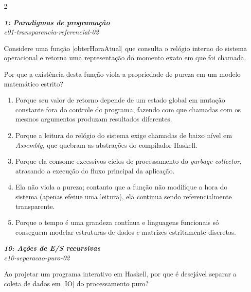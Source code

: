 \documentclass[a4paper,10pt,brazil]{article}
\begin{document}
\begin{multicols}{2}
\begin{enumerate}
\end{enumerate}

\begin{flushright}
  \footnotesize
  \textit{\textbf{1: Paradigmas de programação}}\\
  \textit{c01-transparencia-referencial-02}\\

\end{flushright}
Considere uma função \haskellinline|obterHoraAtual| que consulta o relógio interno do sistema operacional e retorna uma representação do momento exato em que foi chamada.

Por que a existência desta função viola a propriedade de pureza em um modelo matemático estrito?

\begin{enumerate}
  \item Porque seu valor de retorno depende de um estado global em mutação constante fora do controle do programa, fazendo com que chamadas com os mesmos argumentos produzam resultados diferentes.

  \item Porque a leitura do relógio do sistema exige chamadas de baixo nível em \emph{Assembly}, que quebram as abstrações do compilador Haskell.

  \item Porque ela consome excessivos ciclos de processamento do \emph{garbage collector}, atrasando a execução do fluxo principal da aplicação.

  \item Ela não viola a pureza; contanto que a função não modifique a hora do sistema (apenas efetue uma leitura), ela continua sendo referencialmente transparente.

  \item Porque o tempo é uma grandeza contínua e linguagens funcionais só conseguem modelar estruturas de dados e matrizes estritamente discretas.


\end{enumerate}

\begin{flushright}
  \footnotesize
  \textit{\textbf{10: Ações de E/S recursivas}}\\
  \textit{c10-separacao-puro-02}\\

\end{flushright}
Ao projetar um programa interativo em Haskell, por que é desejável separar a coleta de dados em \haskellinline|IO| do processamento puro?


\end{multicols}
\end{document}
